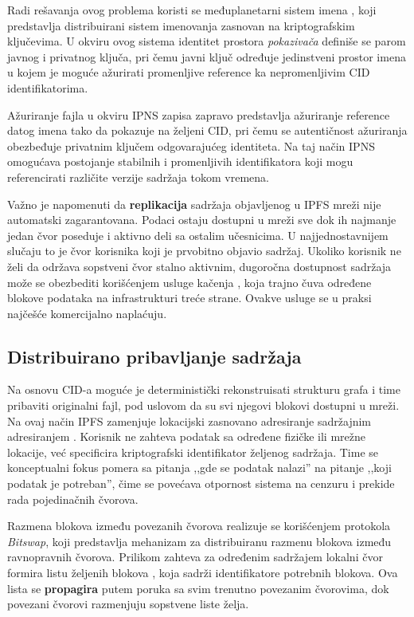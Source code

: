 Radi rešavanja ovog problema koristi se međuplanetarni sistem imena , koji predstavlja distribuirani sistem imenovanja zasnovan na kriptografskim ključevima. U okviru ovog sistema identitet prostora \textit{pokazivača} definiše se parom javnog i privatnog ključa, pri čemu javni ključ određuje jedinstveni prostor imena u kojem je moguće ažurirati promenljive reference ka nepromenljivim CID identifikatorima.

Ažuriranje fajla u okviru IPNS zapisa zapravo predstavlja ažuriranje reference datog imena tako da pokazuje na željeni CID, pri čemu se autentičnost ažuriranja obezbeđuje privatnim ključem odgovarajućeg identiteta. Na taj način IPNS omogućava postojanje stabilnih i promenljivih identifikatora koji mogu referencirati različite verzije sadržaja tokom vremena.

Važno je napomenuti da \textbf{replikacija} sadržaja objavljenog u IPFS mreži nije automatski zagarantovana. Podaci ostaju dostupni u mreži sve dok ih najmanje jedan čvor poseduje i aktivno deli sa ostalim učesnicima. U najjednostavnijem slučaju to je čvor korisnika koji je prvobitno objavio sadržaj. Ukoliko korisnik ne želi da održava sopstveni čvor stalno aktivnim, dugoročna dostupnost sadržaja može se obezbediti korišćenjem usluge kačenja , koja trajno čuva određene blokove podataka na infrastrukturi treće strane. Ovakve usluge se u praksi najčešće komercijalno naplaćuju.

\subsection{Distribuirano pribavljanje sadržaja}
Na osnovu CID-a moguće je deterministički rekonstruisati strukturu grafa i time pribaviti originalni fajl, pod uslovom da su svi njegovi blokovi dostupni u mreži. Na ovaj način IPFS zamenjuje lokacijski zasnovano adresiranje sadržajnim adresiranjem . Korisnik ne zahteva podatak sa određene fizičke ili mrežne lokacije, već specificira kriptografski identifikator željenog sadržaja. Time se konceptualni fokus pomera sa pitanja ,,gde se podatak nalazi'' na pitanje ,,koji podatak je potreban'', čime se povećava otpornost sistema na cenzuru i prekide rada pojedinačnih čvorova.

Razmena blokova između povezanih čvorova realizuje se korišćenjem protokola \textit{Bitswap}, koji predstavlja mehanizam za distribuiranu razmenu blokova između ravnopravnih čvorova. Prilikom zahteva za određenim sadržajem lokalni čvor formira listu željenih blokova , koja sadrži identifikatore potrebnih blokova. Ova lista se \textbf{propagira} putem poruka sa svim trenutno povezanim čvorovima, dok povezani čvorovi razmenjuju sopstvene liste želja.

